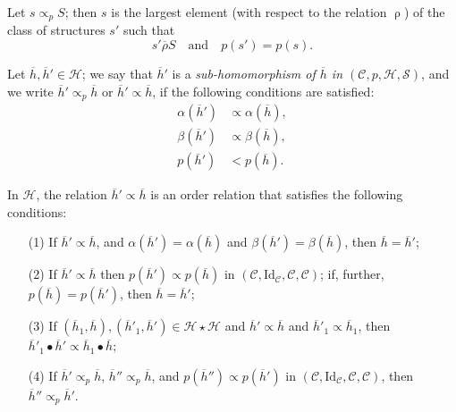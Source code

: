 \documentclass[a4paper,fleqn]{article}
\theoremstyle{plain}
\newenvironment{proposition}[1]
  {\renewcommand\theinnerproposition{#1}\innerproposition}
  {\endinnerproposition}
\newenvironment{corollary}[1]
  {\renewcommand\theinnercorollary{#1}\innercorollary}
  {\endinnercorollary}
\theoremstyle{definition}
\newenvironment{definition}[1]
  {\renewcommand\theinnerdefinition{#1}\innerdefinition}
  {\endinnerdefinition}
\newcommand{\textand}{\quad\text{and}\quad}
\newcommand{\CC}{\mathcal{C}}
\newcommand{\HH}{\mathcal{H}}
\renewcommand{\SS}{\mathcal{S}}
\newcommand{\relrho}{\mathrel{\rho}}
\newcommand{\relrhobar}{\mathrel{\overline{\rho}}}
\newcommand{\subs}{\mathrel{\propto}}
\newcommand{\Id}{\mathrm{Id}}
\begin{document}
\begin{corollary}{2}
  Let $s\subs_p S$;
  then $s$ is the largest element (with respect to the relation $\relrho$) of the class of structures $s'$ such that
  \[
    s'\relrhobar S
    \textand
    p(s') = p(s).
  \]
\end{corollary}

\begin{definition}{8}
\label{definition:i-8}
  Let $\overline{h},\overline{h}'\in\HH$;
  we say that $\overline{h}'$ is a \emph{sub-homomorphism of $\overline{h}$ in $(\CC,p,\HH,\SS)$}, and we write $\overline{h}'\subs_p\overline{h}$ or $\overline{h}'\subs\overline{h}$, if the following conditions are satisfied:
  \[
    \begin{aligned}
      \alpha(\overline{h}')
      &\subs \alpha(\overline{h}),
    \\\beta(\overline{h}')
      &\subs \beta(\overline{h}),
    \\p(\overline{h}')
      &< p(\overline{h}).
    \end{aligned}
  \]
\end{definition}

\begin{proposition}{5}
\label{proposition:i-5}
  In $\HH$, the relation $\overline{h}'\subs\overline{h}$ is an order relation that satisfies the following conditions:
  \begin{enumerate}
    \item[\normalfont(1)]
      If $\overline{h}'\subs\overline{h}$, and $\alpha(\overline{h}')=\alpha(\overline{h})$ and $\beta(\overline{h}')=\beta(\overline{h})$, then $\overline{h}=\overline{h}'$;
    \item[\normalfont(2)]
      If $\overline{h}'\subs\overline{h}$ then $p(\overline{h}')\subs p(\overline{h})$ in $(\CC,\Id_\CC,\CC,\CC)$;
      if, further, $p(\overline{h})=p(\overline{h}')$, then $\overline{h}=\overline{h}'$;
    \item[\normalfont(3)]
      If $(\overline{h}_1,\overline{h}),(\overline{h}'_1,\overline{h}')\in\HH\star\HH$ and $\overline{h}'\subs\overline{h}$ and $\overline{h}'_1\subs\overline{h}_1$, then $\overline{h}'_1\bullet\overline{h}'\subs\overline{h}_1\bullet\overline{h}$;
    \item[\normalfont(4)]
      If $\overline{h}'\subs_p\overline{h}$, $\overline{h}''\subs_p\overline{h}$, and $p(\overline{h}'')\subs p(\overline{h}')$ in $(\CC,\Id_\CC,\CC,\CC)$, then $\overline{h}''\subs_p\overline{h}'$.
  \end{enumerate}
\end{proposition}
\end{document}
